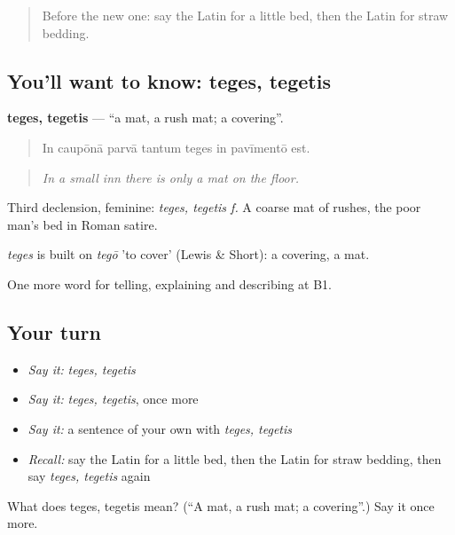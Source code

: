 \begin{quote}
Before the new one: say the Latin for a little bed, then the Latin for straw bedding.
\end{quote}

\subsection*{You'll want to know: teges, tegetis}
\textbf{teges, tegetis} — \textquotedblleft{}a mat, a rush mat; a covering\textquotedblright{}.

\begin{quote}
In caupōnā parvā tantum teges in pavīmentō est.
\end{quote}

\begin{quote}
\emph{In a small inn there is only a mat on the floor.}
\end{quote}

Third declension, feminine: \emph{teges, tegetis f.} A coarse mat of rushes, the poor man's bed in Roman satire.

\begin{cousinweb}
\emph{teges} is built on \emph{tegō} 'to cover' (Lewis \& Short): a covering, a mat.
\end{cousinweb}

\begin{grammarlens}[title={What you've built}]
One more word for telling, explaining and describing at B1.
\end{grammarlens}

\subsection*{Your turn}
\begin{itemize}
\raggedright
  \item \emph{Say it:} \emph{teges, tegetis}
  \item \emph{Say it:} \emph{teges, tegetis}, once more
  \item \emph{Say it:} a sentence of your own with \emph{teges, tegetis}
  \item \emph{Recall:} say the Latin for a little bed, then the Latin for straw bedding, then say \emph{teges, tegetis} again
\end{itemize}

\begin{tcolorbox}[breakable,colback=teal!4,colframe=teal!35!black,title={Before you move on}]
What does teges, tegetis mean? (\textquotedblleft{}A mat, a rush mat; a covering\textquotedblright{}.) Say it once more.
\end{tcolorbox}
